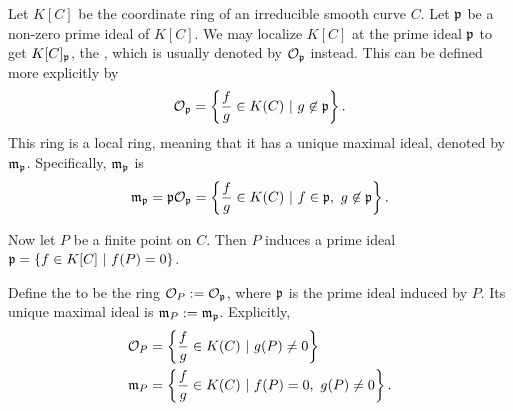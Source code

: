 Let $K[C]$ be the coordinate ring of an irreducible smooth curve $C$.
Let $\frak p$ be a non-zero prime ideal of $K[C]$.
We may localize $K[C]$ at the prime ideal $\frak p$ to get $K[C]_{\frak p}$,
the ,
which is usually denoted by $\cal O_\frak p$ instead.
This can be defined more explicitly by
\[ \cal O_{\frak p} = \left\{ \frac f g \in K(C) ~|~ g \not \in \frak p \right\}. \]
This ring is a local ring, meaning that it has a unique maximal ideal, denoted by $\frak m_{\frak p}$.
Specifically, $\frak m_{\frak p}$ is 
\[ \frak m_{\frak p} = \frak p \cal O_{\frak p} =
   \left\{ \frac f g \in K(C) ~|~ f \in \frak p, ~g \not \in \frak p \right\}. \]

Now let $P$ be a finite point on $C$. Then $P$ induces a prime ideal
$\frak p = \{ f \in K[C] ~|~ f(P) = 0 \}$.
\begin{comment}
\begin{proposition}
  Let $P$ be an affine point on a curve $C$ and let
  \[ \frak p = \{ f \in K[C] ~|~ f(P) = 0 \}. \]
  Then $\frak p$ is a non-zero prime ideal of $K[C]$.
\end{proposition}
\begin{proof}
  \begin{description}
    \item[$\frak p$ is non-zero:]
      Let $P = (x_0, y_0)$.
      Then $x_0$ is an element of some finite algebraic extension $L$ of $K$.
      Let $m(x)$ be the minimal polynomial of $x_0$.
      Then $m(x) \in K[x]$ is univariate, non-zero, and may be viewed instead as $m(x,y) \in K[x,y]$.
      Then $m(x_0, y_0) = m(x_0) = 0$, hence $m(x,y) \in \frak p$.
    \item[$\frak p$ is prime:]
      Suppose $fg \in \frak p$. Then
      \begin{align*}
        & (fg)(P) = 0 \\
        \implies & f(P)g(P) = 0 \\
        \implies & f(P) = 0 \text{ or } g(P) = 0 \\
        \implies & f \in \frak p \text{ or } g \in \frak p.
      \end{align*}
  \end{description}
\end{proof}
\end{comment}
Define the  to be the ring $\cal O_P := \cal O_{\frak p}$,
where $\frak p$ is the prime ideal induced by $P$.
Its unique maximal ideal is $\frak m_P := \frak m_{\frak p}$. Explicitly,
\begin{align*}
  \cal O_P &= \left\{ \frac f g \in K(C) ~|~ g(P) \neq 0 \right\} \\
  \frak m_P &= \left\{ \frac f g \in K(C) ~|~ f(P) = 0, ~g(P) \neq 0 \right\}.
\end{align*}


